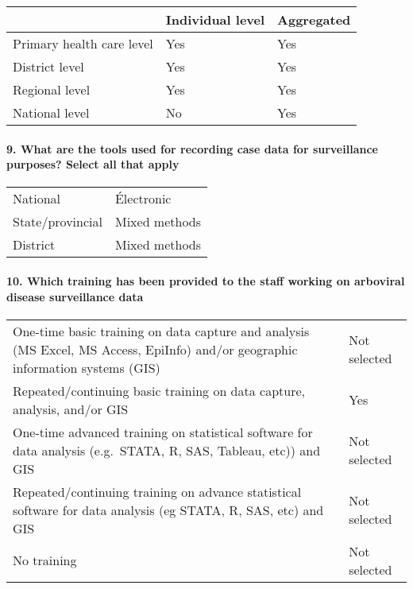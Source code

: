 \documentclass[
]{article}
\begin{document}
\begin{longtable}[]{@{}lll@{}}
\toprule
& Individual level & Aggregated \\
\midrule
\endhead
Primary health care level & Yes & Yes \\
District level & Yes & Yes \\
Regional level & Yes & Yes \\
National level & No & Yes \\
\bottomrule
\end{longtable}

\hypertarget{what-are-the-tools-used-for-recording-case-data-for-surveillance-purposes-select-all-that-apply}{%
\paragraph{9. What are the tools used for recording case data for
surveillance purposes? Select all that
apply}\label{what-are-the-tools-used-for-recording-case-data-for-surveillance-purposes-select-all-that-apply}}

\begin{longtable}[]{@{}ll@{}}
\toprule
\endhead
National & Électronic \\
State/provincial & Mixed methods \\
District & Mixed methods \\
\bottomrule
\end{longtable}

\hypertarget{which-training-has-been-provided-to-the-staff-working-on-arboviral-disease-surveillance-data}{%
\paragraph{10. Which training has been provided to the staff working on
arboviral disease surveillance
data}\label{which-training-has-been-provided-to-the-staff-working-on-arboviral-disease-surveillance-data}}

\begin{longtable}[]{@{}
  >{\raggedright\arraybackslash}p{}
  >{\raggedright\arraybackslash}p{}@{}}
\toprule
\endhead
One-time basic training on data capture and analysis (MS Excel, MS
Access, EpiInfo) and/or geographic information systems (GIS) & Not
selected \\
Repeated/continuing basic training on data capture, analysis, and/or GIS
& Yes \\
One-time advanced training on statistical software for data analysis
(e.g.~STATA, R, SAS, Tableau, etc)) and GIS & Not selected \\
Repeated/continuing training on advance statistical software for data
analysis (eg STATA, R, SAS, etc) and GIS & Not selected \\
No training & Not selected \\
\bottomrule
\end{longtable}
\end{document}
